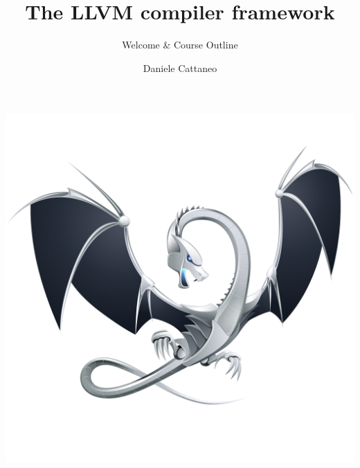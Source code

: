 

\author{Daniele Cattaneo}
\date{\DATE}
\title{The LLVM compiler framework}
\subtitle{Welcome \& Course Outline}
\newcommand{\customdata}{Daniele Cattaneo <daniele.cattaneo@polimi.it>}





\begin{frame}
\maketitle
\end{frame}

\begin{frame}[plain]{}
  \begin{center}
    \vspace{-.05\textheight}
    \includegraphics[width=\textwidth]{img/logo.pdf}
  \end{center}
\end{frame}

